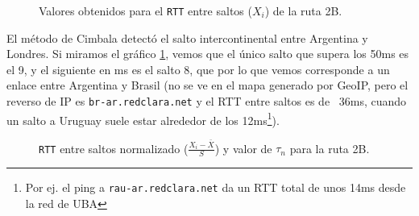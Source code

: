 \begin{figure}[H]
    \caption{Valores obtenidos para el \texttt{RTT} entre saltos ($X_i$) de la ruta 2B.}
    \label{res:esc2b:rtt}
\end{figure}

El método de Cimbala detectó el salto intercontinental entre Argentina y Londres. Si miramos el gráfico \ref{res:esc2b:rtt}, vemos que el único salto que supera los 50ms es el 9, y el siguiente en ms es el salto 8, que por lo que vemos corresponde a un enlace entre Argentina y Brasil (no se ve en el mapa generado por GeoIP, pero el reverso de IP es \texttt{br-ar.redclara.net} y el RTT entre saltos es de ~36ms, cuando un salto a Uruguay suele estar alrededor de los 12ms\footnote{Por ej. el ping a \texttt{rau-ar.redclara.net} da un RTT total de unos 14ms desde la red de UBA}).

\begin{figure}[H]
    \caption{\texttt{RTT} entre saltos normalizado ($\frac{X_i-\bar{X}}{S}$)
    y valor de $\tau_n$ para la ruta 2B.}
    \label{res:esc2b:rttnorm}
\end{figure}